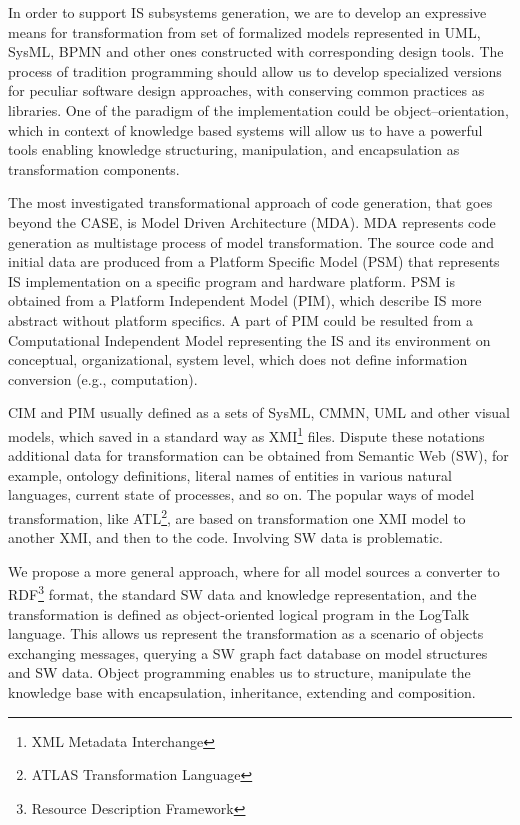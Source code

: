 \documentclass[conference]{IEEEtran}
\begin{document}
In order to support IS subsystems generation, we are to develop an expressive means for transformation from set of formalized models represented in UML, SysML, BPMN and other ones constructed with corresponding design tools.  The process of tradition programming should allow us to develop specialized versions for peculiar software design approaches, with conserving common practices as libraries.  One of the paradigm of the implementation could be object--orientation, which in context of knowledge based systems will allow us to have a powerful tools enabling knowledge structuring, manipulation, and encapsulation as transformation components.  %

The most investigated transformational approach of code generation, that goes beyond the CASE, is Model Driven Architecture (MDA).  MDA represents code generation as multistage process of model transformation.  The source code and initial data are produced from a Platform Specific Model (PSM) that represents IS implementation on a specific program and hardware platform.  PSM is obtained from a Platform Independent Model (PIM), which describe IS more abstract without platform specifics.  A part of PIM could be resulted from a Computational Independent Model representing the IS and its environment on conceptual, organizational, system level, which does not define information conversion (e.g., computation).

CIM and PIM usually defined as a sets of SysML, CMMN, UML and other visual models, which saved in a standard way as XMI\footnote{XML Metadata Interchange} files.  Dispute these notations additional data for transformation can be obtained from Semantic Web (SW), for example, ontology definitions, literal names of entities in various natural languages, current state of processes, and so on.  The popular ways of model transformation, like ATL\footnote{ATLAS Transformation Language}, are based on transformation one XMI model to another XMI, and then to the code.  Involving SW data is problematic.

We propose a more general approach, where for all model sources a converter to RDF\footnote{Resource Description Framework} format, the standard SW data and knowledge representation, and the transformation is defined as object-oriented logical program in the LogTalk language.  This allows us represent the transformation as a scenario of objects exchanging messages, querying a SW graph fact database on model structures and SW data.  Object programming enables us to structure, manipulate the knowledge base with encapsulation, inheritance, extending and composition.
\end{document}
